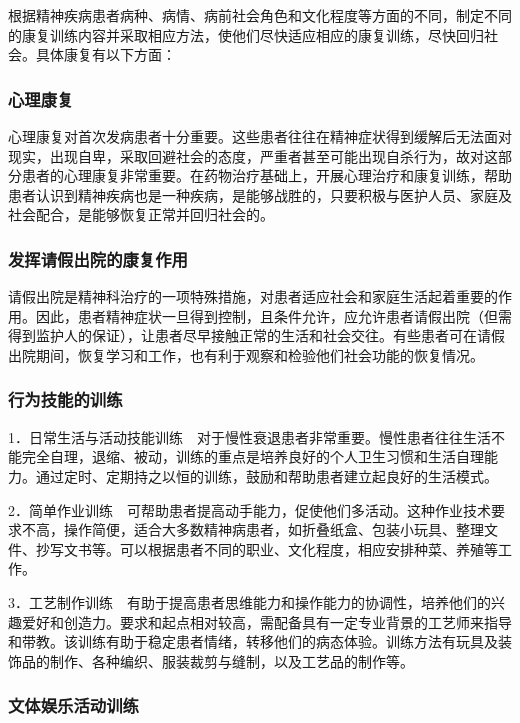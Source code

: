 根据精神疾病患者病种、病情、病前社会角色和文化程度等方面的不同，制定不同的康复训练内容并采取相应方法，使他们尽快适应相应的康复训练，尽快回归社会。具体康复有以下方面：

\subsubsection{心理康复}

心理康复对首次发病患者十分重要。这些患者往往在精神症状得到缓解后无法面对现实，出现自卑，采取回避社会的态度，严重者甚至可能出现自杀行为，故对这部分患者的心理康复非常重要。在药物治疗基础上，开展心理治疗和康复训练，帮助患者认识到精神疾病也是一种疾病，是能够战胜的，只要积极与医护人员、家庭及社会配合，是能够恢复正常并回归社会的。

\subsubsection{发挥请假出院的康复作用}

请假出院是精神科治疗的一项特殊措施，对患者适应社会和家庭生活起着重要的作用。因此，患者精神症状一旦得到控制，且条件允许，应允许患者请假出院（但需得到监护人的保证），让患者尽早接触正常的生活和社会交往。有些患者可在请假出院期间，恢复学习和工作，也有利于观察和检验他们社会功能的恢复情况。

\subsubsection{行为技能的训练}

1．日常生活与活动技能训练　对于慢性衰退患者非常重要。慢性患者往往生活不能完全自理，退缩、被动，训练的重点是培养良好的个人卫生习惯和生活自理能力。通过定时、定期持之以恒的训练，鼓励和帮助患者建立起良好的生活模式。

2．简单作业训练　可帮助患者提高动手能力，促使他们多活动。这种作业技术要求不高，操作简便，适合大多数精神病患者，如折叠纸盒、包装小玩具、整理文件、抄写文书等。可以根据患者不同的职业、文化程度，相应安排种菜、养殖等工作。

3．工艺制作训练　有助于提高患者思维能力和操作能力的协调性，培养他们的兴趣爱好和创造力。要求和起点相对较高，需配备具有一定专业背景的工艺师来指导和带教。该训练有助于稳定患者情绪，转移他们的病态体验。训练方法有玩具及装饰品的制作、各种编织、服装裁剪与缝制，以及工艺品的制作等。

\subsubsection{文体娱乐活动训练}

